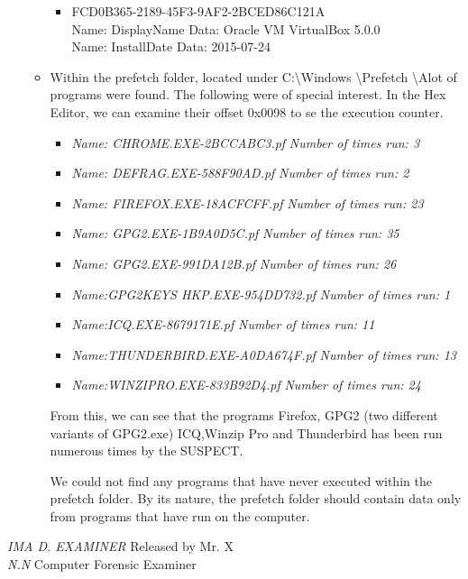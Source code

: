 \begin{enumerate}
\begin{itemize}
\begin{itemize}
		\item \textbraceleft FCD0B365-2189-45F3-9AF2-2BCED86C121A \textbraceright \\
		Name: DisplayName Data: Oracle VM VirtualBox 5.0.0 \\
		Name: InstallDate Data: 2015-07-24 \\
		
		
	\end{itemize}
	
	\item Within the prefetch folder, located under C:\textbackslash Windows \textbackslash Prefetch \textbackslash Alot of programs were found. The following were of special interest. In the Hex Editor, we can examine their offset 0x0098 to se the execution counter.
	
		\begin{itemize}
			\item \textit{Name: CHROME.EXE-2BCCABC3.pf}   \textit{Number of times run: 3}		
			\item \textit{Name: DEFRAG.EXE-588F90AD.pf}   \textit{Number of times run: 2}
			\item \textit{Name: FIREFOX.EXE-18ACFCFF.pf}   \textit{Number of times run: 23}
			\item \textit{Name: GPG2.EXE-1B9A0D5C.pf}   \textit{Number of times run: 35}
			\item \textit{Name: GPG2.EXE-991DA12B.pf}  	\textit{Number of times run: 26}
			\item \textit{Name:GPG2KEYS \textunderscore HKP.EXE-954DD732.pf}   \textit{Number of times run: 1}
			\item \textit{Name:ICQ.EXE-8679171E.pf}   	\textit{Number of times run: 11}
			\item \textit{Name:THUNDERBIRD.EXE-A0DA674F.pf}   \textit{Number of times run: 13}
			\item \textit{Name:WINZIPRO.EXE-833B92D4.pf}  	\textit{Number of times run: 24}
			
		\end{itemize}
	
	From this, we can see that the programs Firefox, GPG2 (two different variants of GPG2.exe) ICQ,Winzip Pro and Thunderbird has been run numerous times by the SUSPECT.
	
	We could not find any programs that have never executed within the prefetch folder. By its nature, the prefetch folder should contain data only from programs that have run on the computer.
	
\end{itemize}

\end{enumerate}

\noindent \textit{IMA D. EXAMINER}	\hfill Released by {\wesa Mr. X}\\
\textit{N.N} Computer Forensic Examiner
\clearpage
